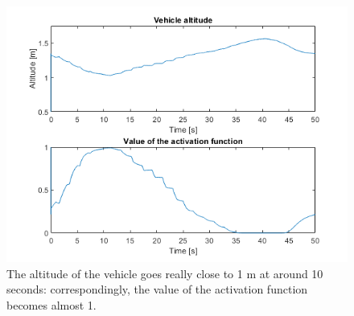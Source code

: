 \documentclass{article}
\begin{document}
\begin{figure}[H]
	\centering
	\includegraphics[scale=0.55]{images/Ex1/SafeNavigation_1m_AltAndActFunct}
	\caption{The altitude of the vehicle goes really close to 1 m at around 10 seconds: correspondingly, the value of the activation function becomes almost 1.}
	\label{fig:ex1.2.3_case1m_c}
\end{figure}
\end{document}
